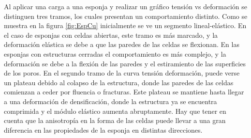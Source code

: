 \documentclass[a4paper,12pt,fleqn,twoside,openany]{book}
\begin{document}
Al aplicar una carga a una esponja y realizar un gráfico tensión vs deformación se distinguen tres tramos, los cuales presentan un comportamiento 
distinto. Como se muestra en la figura \ref{fig:EspCu} inicialmente se ve un segmento lineal-elástico. En el caso de esponjas con celdas abiertas, este tramo 
es más marcado, y la deformación elástica se debe a que las paredes de las celdas se flexionan. En las esponjas con estructuras cerradas el 
comportamiento es más complejo, y la deformación se debe a la flexión de las paredes y el estiramiento de las superficies de los poros. 
En el segundo tramo de la curva tensión deformación, puede verse un plateau debido al colapso de la estructura, donde las paredes de las celdas 
comienzan a ceder por fluencia o fracturas. Este plateau se mantiene hasta llegar a una deformación de densificación, donde la estructura ya se encuentra 
comprimida y el módulo elástico aumenta abruptamente. Hay que tener en cuenta que la anisotropía en la forma de las celdas puede llevar a una gran diferencia 
en las propiedades de la esponja en distintas direcciones.
\end{document}
